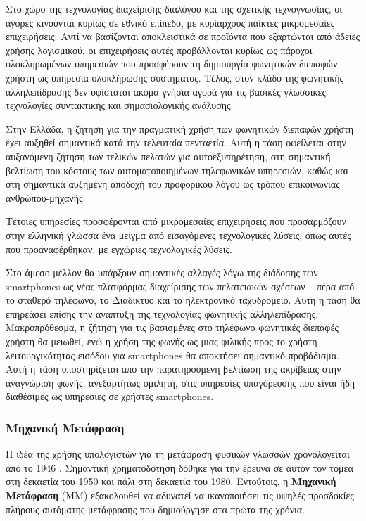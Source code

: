 \documentclass[]{../../metanetpaper}
\begin{document}
\begin{multicols}{2}
Στο χώρο της τεχνολογίας διαχείρισης διαλόγου και της σχετικής τεχνογνωσίας, οι αγορές κινούνται κυρίως σε εθνικό επίπεδο, με κυρίαρχους παίκτες μικρομεσαίες επιχειρήσεις. Αντί να βασίζονται αποκλειστικά σε προϊόντα που εξαρτώνται από άδειες χρήσης λογισμικού, οι επιχειρήσεις αυτές προβάλλονται κυρίως ως πάροχοι ολοκληρωμένων υπηρεσιών που προσφέρουν τη δημιουργία φωνητικών διεπαφών χρήστη ως υπηρεσία ολοκλήρωσης συστήματος. Τέλος, στον κλάδο της φωνητικής αλληλεπίδρασης δεν υφίσταται ακόμα γνήσια αγορά για τις βασικές γλωσσικές τεχνολογίες συντακτικής και σημασιολογικής ανάλυσης.

Στην Ελλάδα, η ζήτηση για την πραγματική χρήση των φωνητικών διεπαφών χρήστη έχει αυξηθεί σημαντικά κατά την τελευταία πενταετία. Αυτή η τάση οφείλεται στην αυξανόμενη ζήτηση των τελικών πελατών για αυτοεξυπηρέτηση, στη σημαντική βελτίωση του κόστους των αυτοματοποιημένων τηλεφωνικών υπηρεσιών, καθώς και στη σημαντικά αυξημένη αποδοχή του προφορικού λόγου ως τρόπου επικοινωνίας  ανθρώπου-μηχανής.

Τέτοιες υπηρεσίες προσφέρονται από μικρομεσαίες επιχειρήσεις που προσαρμόζουν στην ελληνική γλώσσα ένα μείγμα από εισαγόμενες τεχνολογικές λύσεις, όπως αυτές που προαναφέρθηκαν, με εγχώριες τεχνολογικές λύσεις.

Στο άμεσο μέλλον θα υπάρξουν σημαντικές αλλαγές λόγω της διάδοσης των smartphones ως νέας πλατφόρμας διαχείρισης των πελατειακών σχέσεων – πέρα από το σταθερό τηλέφωνο, το Διαδίκτυο και το ηλεκτρονικό ταχυδρομείο. Αυτή η τάση θα επηρεάσει επίσης την ανάπτυξη της τεχνολογίας φωνητικής αλληλεπίδρασης. Μακροπρόθεσμα, η ζήτηση για τις βασισμένες στο τηλέφωνο φωνητικές διεπαφές χρήστη θα μειωθεί, ενώ η χρήση της φωνής ως μιας φιλικής προς το χρήστη λειτουργικότητας εισόδου για smartphones θα αποκτήσει σημαντικό προβάδισμα. Αυτή η τάση υποστηρίζεται από την παρατηρούμενη βελτίωση της ακρίβειας στην αναγνώριση φωνής, ανεξαρτήτως ομιλητή, στις υπηρεσίες υπαγόρευσης που είναι ήδη διαθέσιμες ως υπηρεσίες σε χρήστες smartphones.

\subsubsection{Μηχανική Μετάφραση}

Η ιδέα της χρήσης υπολογιστών για τη μετάφραση φυσικών γλωσσών χρονολογείται από το 1946 . Σημαντική χρηματοδότηση δόθηκε για την έρευνα σε αυτόν τον τομέα στη δεκαετία του 1950 και πάλι στη δεκαετία του 1980. Εντούτοις, η \textbf{Μηχανική Μετάφραση} (ΜΜ) εξακολουθεί να αδυνατεί να ικανοποιήσει τις υψηλές προσδοκίες πλήρους αυτόματης μετάφρασης που δημιούργησε στα πρώτα της χρόνια.


\end{multicols}
\end{document}
